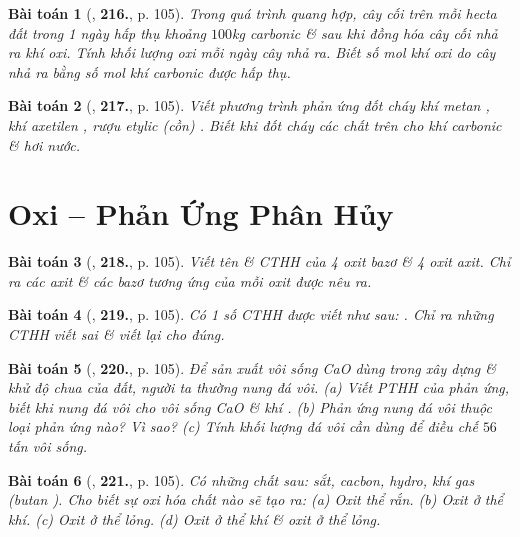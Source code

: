 \documentclass{article}
\numberwithin{equation}{section}
\newtheorem{baitoan}{Bài toán}
\begin{document}
\begin{baitoan}[\cite{An_400_BT_Hoa_Hoc_8_2020}, \textbf{216.}, p. 105]
	Trong quá trình quang hợp, cây cối trên mỗi hecta đất trong 1 ngày hấp thụ khoảng $100$\emph{kg} carbonic \& sau khi đồng hóa cây cối nhả ra khí oxi. Tính khối lượng oxi mỗi ngày cây nhả ra. Biết số mol khí oxi do cây nhả ra bằng số mol khí carbonic được hấp thụ.
\end{baitoan}

\begin{baitoan}[\cite{An_400_BT_Hoa_Hoc_8_2020}, \textbf{217.}, p. 105]
	Viết phương trình phản ứng đốt cháy khí metan \emph{}, khí axetilen \emph{}, rượu etylic (cồn) \emph{}. Biết khi đốt cháy các chất trên cho khí carbonic \& hơi nước.
\end{baitoan}


\section{Oxi -- Phản Ứng Phân Hủy}

\begin{baitoan}[\cite{An_400_BT_Hoa_Hoc_8_2020}, \textbf{218.}, p. 105]
	Viết tên \& CTHH của 4 oxit bazơ \& 4 oxit axit. Chỉ ra các axit \& các bazơ tương ứng của mỗi oxit được nêu ra.
\end{baitoan}

\begin{baitoan}[\cite{An_400_BT_Hoa_Hoc_8_2020}, \textbf{219.}, p. 105]
	Có 1 số CTHH được viết như sau: \emph{}. Chỉ ra những CTHH viết sai \& viết lại cho đúng.
\end{baitoan}

\begin{baitoan}[\cite{An_400_BT_Hoa_Hoc_8_2020}, \textbf{220.}, p. 105]
	Để sản xuất vôi sống \emph{CaO} dùng trong xây dựng \& khử độ chua của đất, người ta thường nung đá vôi. (a) Viết PTHH của phản ứng, biết khi nung đá vôi cho vôi sống \emph{CaO} \& khí \emph{}. (b) Phản ứng nung đá vôi thuộc loại phản ứng nào? Vì sao? (c) Tính khối lượng đá vôi cần dùng để điều chế $56$ tấn vôi sống.
\end{baitoan}

\begin{baitoan}[\cite{An_400_BT_Hoa_Hoc_8_2020}, \textbf{221.}, p. 105]
	Có những chất sau: sắt, cacbon, hydro, khí gas (butan \emph{}). Cho biết sự oxi hóa chất nào sẽ tạo ra: (a) Oxit thể rắn. (b) Oxit ở thể khí. (c) Oxit ở thể lỏng. (d) Oxit ở thể khí \& oxit ở thể lỏng.
\end{baitoan}
\end{document}
